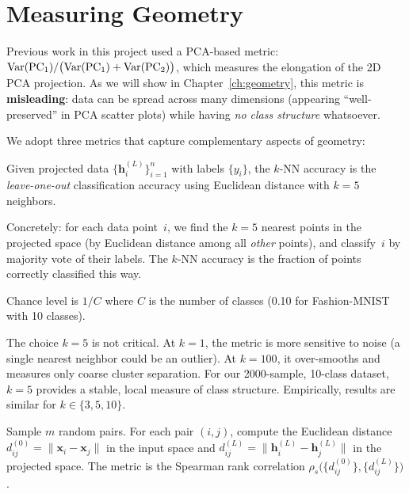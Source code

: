 \section{Measuring Geometry}
\label{sec:geometry_metrics}

Previous work in this project used a PCA-based metric:
$\operatorname{Var}(\text{PC}_1)/\bigl(\operatorname{Var}(\text{PC}_1) + \operatorname{Var}(\text{PC}_2)\bigr)$,
which measures the elongation of the 2D PCA projection.
As we will show in Chapter~\ref{ch:geometry}, this metric is
\textbf{misleading}: data can be spread across many dimensions
(appearing ``well-preserved'' in PCA scatter plots) while having
\emph{no class structure} whatsoever.

We adopt three metrics that capture complementary aspects of geometry:

\begin{definition}[$k$-NN accuracy]
\label{def:knn}
Given projected data $\{\bm{h}_i^{(L)}\}_{i=1}^{n}$ with labels
$\{y_i\}$, the $k$-NN accuracy is the \emph{leave-one-out}
classification accuracy using Euclidean distance with $k=5$ neighbors.

Concretely: for each data point~$i$, we find the $k=5$ nearest
points in the projected space (by Euclidean distance among all
\emph{other} points), and classify~$i$ by majority vote of their
labels.  The $k$-NN accuracy is the fraction of points correctly
classified this way.

Chance level is $1/C$ where $C$ is the number of classes
(0.10 for Fashion-MNIST with 10 classes).
\end{definition}

\begin{remark}
The choice $k=5$ is not critical.  At $k=1$, the metric is more
sensitive to noise (a single nearest neighbor could be an outlier).
At $k=100$, it over-smooths and measures only coarse cluster
separation.  For our 2000-sample, 10-class dataset, $k=5$
provides a stable, local measure of class structure.
Empirically, results are similar for $k \in \{3, 5, 10\}$.
\end{remark}

\begin{definition}
Sample $m$ random pairs.  For each pair $(i,j)$, compute the
Euclidean distance $d^{(0)}_{ij} = \|\bm{x}_i - \bm{x}_j\|$
in the input space and
$d^{(L)}_{ij} = \|\bm{h}_i^{(L)} - \bm{h}_j^{(L)}\|$
in the projected space.  The metric is the Spearman rank correlation
$\rho_s\!\bigl(\{d^{(0)}_{ij}\}, \{d^{(L)}_{ij}\}\bigr)$.
\end{definition}

